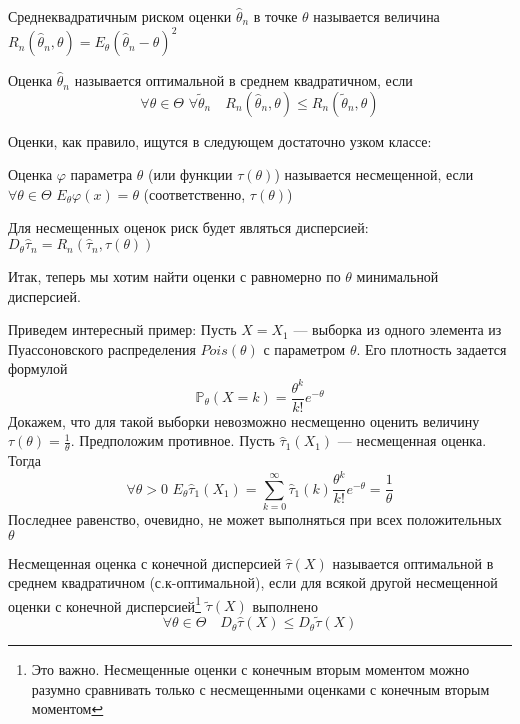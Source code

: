 \documentclass[12pt, russian]{article}
\begin{document}
\begin{mydef}
Среднеквадратичным риском оценки $\hat{\theta}_n$ в точке $\theta$ называется величина $R_n(\hat{\theta}_n, \theta) = E_\theta(\hat{\theta}_n - \theta)^2$
\end{mydef}

\begin{mydef}
Оценка $\hat{\theta}_n$ называется оптимальной в среднем квадратичном, если
$$ \forall \theta \in \Theta \,\, \forall \tilde{\theta}_n \quad R_n(\hat{\theta}_n, \theta) \leq R_n(\tilde{\theta}_n, \theta)$$
\end{mydef}

Оценки, как правило, ищутся в следующем достаточно узком классе:

\begin{mydef}
Оценка $\varphi$ параметра $\theta$ (или функции $\tau(\theta)$) называется несмещенной, если $\forall \theta \in \Theta \,\, E_\theta\varphi(x) = \theta$ (соответственно, $\tau(\theta)$)
\end{mydef}

Для несмещенных оценок риск будет являться дисперсией: $D_\theta\hat{\tau}_n = R_n(\hat{\tau}_n, \tau(\theta))$

Итак, теперь мы хотим найти оценки с равномерно по $\theta$ минимальной дисперсией. 

Приведем интересный пример:
Пусть $X = X_1$ --- выборка из одного элемента из Пуассоновского распределения $Pois(\theta)$ с параметром $\theta$. Его плотность задается формулой 
$$ \mathbb{P}_\theta(X = k) = \frac{\theta^k}{k!} e^{-\theta} $$
Докажем, что для такой выборки невозможно несмещенно оценить величину $\tau(\theta) = \frac{1}{\theta}$. Предположим противное. Пусть $\hat{\tau}_1(X_1)$ --- несмещенная оценка. Тогда
$$ \forall\theta>0\,\,E_\theta\hat{\tau}_1(X_1) = \sum\limits_{k=0}^\infty{\hat{\tau}_1(k) \frac{\theta^k}{k!} e^{-\theta}} = \frac{1}{\theta} $$
Последнее равенство, очевидно, не может выполняться при всех положительных $\theta$

\begin{mydef}
Несмещенная оценка с конечной дисперсией $\hat{\tau}(X)$ называется оптимальной в среднем квадратичном (с.к-оптимальной), если для всякой другой несмещенной оценки с конечной дисперсией\footnote{Это важно. Несмещенные оценки с конечным вторым моментом можно разумно сравнивать только с несмещенными оценками с конечным вторым моментом} $\tilde{\tau}(X)$ выполнено
$$ \forall\theta\in\Theta\quad D_\theta\hat{\tau}(X) \leq D_\theta\tilde{\tau}(X) $$
\end{mydef}
\end{document}
